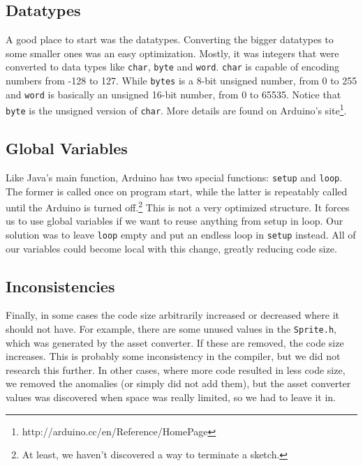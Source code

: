 \subsection*{Datatypes} %
A good place to start was the datatypes. Converting the bigger datatypes to some smaller ones was an easy optimization. Mostly, it was integers that were converted to data types like {\tt char}, {\tt byte} and {\tt word}. {\tt char} is capable of encoding numbers from -128 to 127. While {\tt bytes} is a 8-bit unsigned number, from 0 to 255 and {\tt word} is basically an unsigned 16-bit number, from 0 to 65535. Notice that {\tt byte} is the unsigned version of {\tt char}. More details are found on Arduino's site\footnote{http://arduino.cc/en/Reference/HomePage}.

\subsection*{Global Variables} %
Like Java's main function, Arduino has two special functions: {\tt setup} and {\tt loop}. The former is called once on program start, while the latter is repeatably called until the Arduino is turned off.\footnote{At least, we haven't discovered a way to terminate a sketch.} This is not a very optimized structure. It forces us to use global variables if we want to reuse anything from setup in loop. Our solution was to leave {\tt loop} empty and put an endless loop in {\tt setup} instead. All of our variables could become local with this change, greatly reducing code size.

\subsection*{Inconsistencies} %
Finally, in some cases the code size arbitrarily increased or decreased where it should not have. For example, there are some unused values in the {\tt Sprite.h}, which was generated by the asset converter. If these are removed, the code size increases. This is probably some inconsistency in the compiler, but we did not research this further. In other cases, where more code resulted in less code size, we removed the anomalies (or simply did not add them), but the asset converter values was discovered when space was really limited, so we had to leave it in.
